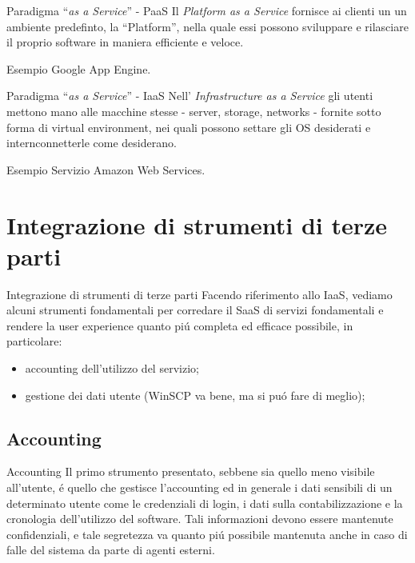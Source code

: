 \documentclass{beamer}
\begin{document}
\begin{frame}{Paradigma ``\emph{as a Service}'' - PaaS}
Il \emph{Platform as a Service} fornisce ai clienti un un ambiente predefinto, la ``Platform'',  nella quale essi possono
sviluppare e rilasciare il proprio software in maniera efficiente e veloce.
\begin{exampleblock}{Esempio}
Google App Engine.
\end{exampleblock}
\end{frame}


\begin{frame}{Paradigma ``\emph{as a Service}'' - IaaS}
Nell' \emph{Infrastructure as a Service} gli utenti mettono mano alle macchine stesse - server, storage, networks - fornite sotto
forma di virtual environment, nei quali possono settare gli OS desiderati e internconnetterle come desiderano.
\begin{exampleblock}{Esempio}
Servizio Amazon Web Services.
\end{exampleblock}
\end{frame}


\section{Integrazione di strumenti di terze parti}
\begin{frame}{Integrazione di strumenti di terze parti}
Facendo riferimento allo IaaS, vediamo alcuni strumenti fondamentali per corredare il SaaS di servizi fondamentali e rendere la user experience quanto pi\'u completa ed efficace possibile, in particolare:
\begin{itemize}
\item accounting dell'utilizzo del servizio;
\item gestione dei dati utente (WinSCP va bene, ma si pu\'o fare di meglio);
\end{itemize}
\end{frame}


\subsection{Accounting}
\begin{frame}{Accounting}
Il primo strumento presentato, sebbene sia quello meno visibile all'utente, \'e quello che gestisce l'accounting ed in generale i dati
sensibili di un determinato utente come le credenziali di login, i dati sulla contabilizzazione e la cronologia dell'utilizzo del software.
Tali informazioni devono essere mantenute confidenziali, e tale segretezza va quanto pi\'u possibile mantenuta anche in caso
di falle del sistema da parte di agenti esterni.
\end{frame}
\end{document}
